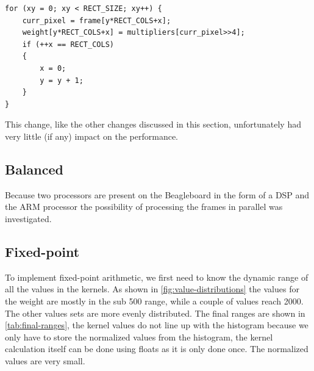 \documentclass[final]{article}
\begin{document}
\begin{lstlisting}[style=c, caption=Coalesced loop for weight calculation, label=lst:coalesced]
for (xy = 0; xy < RECT_SIZE; xy++) {
    curr_pixel = frame[y*RECT_COLS+x];
    weight[y*RECT_COLS+x] = multipliers[curr_pixel>>4];
    if (++x == RECT_COLS)
    {
        x = 0;
        y = y + 1;
    }
}
\end{lstlisting}

This change, like the other changes discussed in this section, unfortunately had very little (if any) impact on the performance.

\subsection{Balanced}
Because two processors are present on the Beagleboard in the form of a DSP and the ARM processor the possibility of processing the frames in parallel was investigated.

\subsection{Fixed-point}
To implement fixed-point arithmetic, we first need to know the dynamic range of all the values in the kernels.
As shown in \cref{fig:value-distributions} the values for the weight are mostly in the sub \num{500} range, while a couple of values reach \num{2000}.
The other values sets are more evenly distributed.
The final ranges are shown in \cref{tab:final-ranges}, the kernel values do not line up with the histogram because we only have to store the normalized values from the histogram, the kernel calculation itself can be done using floats as it is only done once.
The normalized values are very small.
\end{document}
